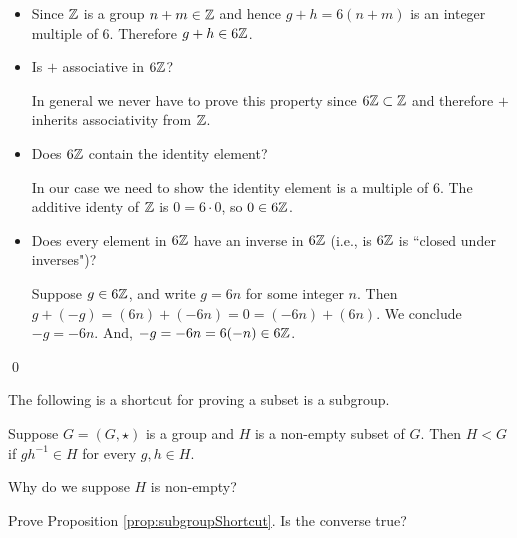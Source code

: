 \documentclass[../algebraNotesMSRI-UP2016.tex]{subfiles}
\begin{document}
\begin{frame}
\begin{itemize}
\item[] Since $\mathbb Z$ is a group $n+m\in\mathbb Z$ and hence $g+h=6(n+m)$ is an integer multiple of $6$.  Therefore $g+h\in 6\mathbb Z$.
\item Is $+$ associative in $6\mathbb Z$?  

\smallGap
In general we never have to prove this property since $6\mathbb Z\subset \mathbb Z$ and therefore $+$ inherits associativity from $\mathbb Z$.
\item Does $6\mathbb Z$ contain the identity element?

\smallGap
In our case we need to show the identity element is a multiple of $6$.  The additive identy of $\mathbb Z$ is $0=6\cdot 0$, so $0\in 6\mathbb Z$.
\item Does every element in $6\mathbb Z$ have an inverse in $6\mathbb Z$ (i.e., is $6\mathbb Z$ is ``closed under inverses")?

\smallGap
Suppose $g\in 6\mathbb Z$, and write $g=6n$ for some integer $n$.  Then $g+(-g)=(6n)+(-6n)=0=(-6n)+(6n)$.  We conclude $-g=-6n$.  And, $-g=-6n=6(-n)\in 6\mathbb Z$.
\end{itemize}
\qed
\end{frame}


\begin{frame}[c]
The following is a shortcut for proving a subset is a subgroup.

\smallGap
\begin{prop}\label{prop:subgroupShortcut}
Suppose $G=(G,\star)$ is a group and $H$ is a non-empty subset of $G$.  Then $H< G$ if $gh^{-1}\in H$ for every $g,h\in H$. 
\end{prop}

\smallGap
\begin{que}
Why do we suppose $H$ is non-empty?
\end{que}

\smallGap
\begin{exe}\label{exe:subgroupShortcut}
Prove Proposition \ref{prop:subgroupShortcut}.  Is the converse true?
\end{exe}
\end{frame}
\end{document}
